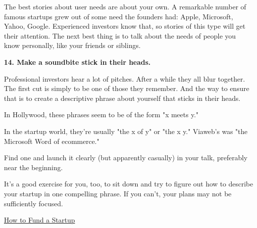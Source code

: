 The best
                    stories about user needs are about your own. A remarkable
                    number of famous startups grew out of some need the founders
                    had: Apple, Microsoft, Yahoo, Google. Experienced investors
                    know that, so stories of this type will get their attention.
                    The next best thing is to talk about the needs of people you
                    know personally, like your friends or siblings.

\textbf{14. Make a soundbite stick in their heads.}

Professional investors hear a lot of pitches.
                    After a while they all blur together. The first cut is
                    simply to be one of those they remember. And the way to
                    ensure that is to create a descriptive phrase about yourself
                    that sticks in their heads.

In Hollywood, these
                    phrases seem to be of the form "x meets y."
                    
                    In the startup world, they're usually "the x of y" or "the x
                    y." Viaweb's was "the Microsoft Word of ecommerce."

Find
                    one and launch it clearly (but apparently casually) in your
                    talk, preferably near the beginning.

It's a good
                    exercise for you, too, to sit down and try to figure out how
                    to describe your startup in one compelling phrase. If you
                    can't, your plans may not be sufficiently focused.




              
            
          

            
              
            
            
              
                
              
              
              
                \href{http://www.paulgraham.com/startupfunding.html}{How to Fund a Startup}


              
              
              
                
              
              
